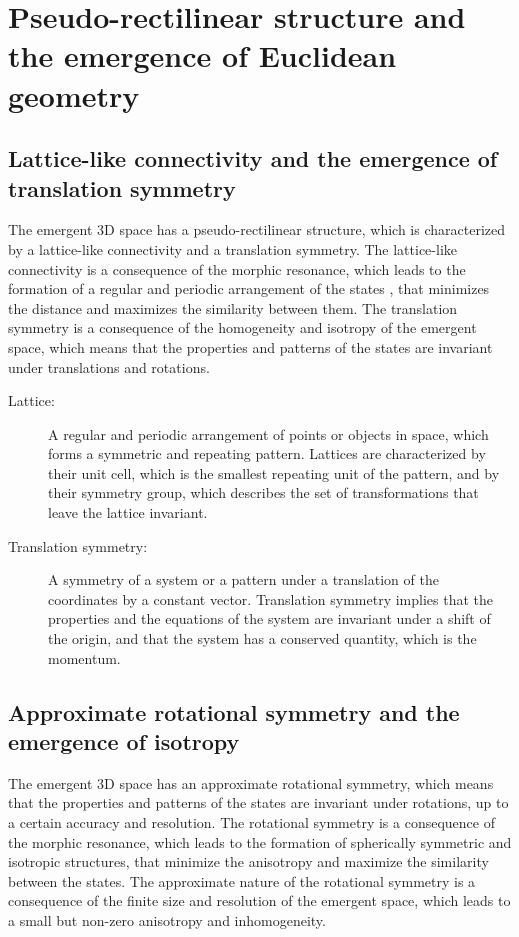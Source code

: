 \section{Pseudo-rectilinear structure and the emergence of Euclidean geometry}
\subsection{Lattice-like connectivity and the emergence of translation symmetry}
The emergent 3D space has a pseudo-rectilinear structure, which is characterized by a lattice-like connectivity and a translation symmetry. The lattice-like connectivity is a consequence of the morphic resonance, which leads to the formation of a regular and periodic arrangement of the states , that minimizes the distance and maximizes the similarity between them. The translation symmetry is a consequence of the homogeneity and isotropy of the emergent space, which means that the properties and patterns of the states are invariant under translations and rotations.

\begin{tcolorbox}[colback=blue!5!white,colframe=blue!75!black,title=New terms]
    \begin{description}
        \item[Lattice:] A regular and periodic arrangement of points or objects in space, which forms a symmetric and repeating pattern. Lattices are characterized by their unit cell, which is the smallest repeating unit of the pattern, and by their symmetry group, which describes the set of transformations that leave the lattice invariant.
        \item[Translation symmetry:] A symmetry of a system or a pattern under a translation of the coordinates by a constant vector. Translation symmetry implies that the properties and the equations of the system are invariant under a shift of the origin, and that the system has a conserved quantity, which is the momentum.
    \end{description}
\end{tcolorbox}

\subsection{Approximate rotational symmetry and the emergence of isotropy}
The emergent 3D space has an approximate rotational symmetry, which means that the properties and patterns of the states are invariant under rotations, up to a certain accuracy and resolution. The rotational symmetry is a consequence of the morphic resonance, which leads to the formation of spherically symmetric and isotropic structures, that minimize the anisotropy and maximize the similarity between the states. The approximate nature of the rotational symmetry is a consequence of the finite size and resolution of the emergent space, which leads to a small but non-zero anisotropy and inhomogeneity.

